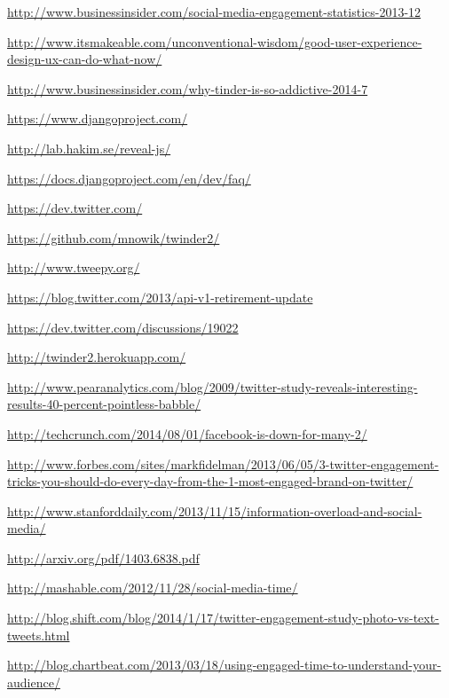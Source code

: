 \begin{thebibliography}{9}
\url{http://www.businessinsider.com/social-media-engagement-statistics-2013-12}


\url{http://www.itsmakeable.com/unconventional-wisdom/good-user-experience-design-ux-can-do-what-now/}

\url{http://www.businessinsider.com/why-tinder-is-so-addictive-2014-7}


\url{https://www.djangoproject.com/}

\url{http://lab.hakim.se/reveal-js/}

\url{https://docs.djangoproject.com/en/dev/faq/}

\url{https://dev.twitter.com/}

\url{https://github.com/mnowik/twinder2/}

\url{http://www.tweepy.org/}

\url{https://blog.twitter.com/2013/api-v1-retirement-update}

\url{https://dev.twitter.com/discussions/19022}

\url{http://twinder2.herokuapp.com/}



\url{http://www.pearanalytics.com/blog/2009/twitter-study-reveals-interesting-results-40-percent-pointless-babble/}

\url{http://techcrunch.com/2014/08/01/facebook-is-down-for-many-2/}

\url{http://www.forbes.com/sites/markfidelman/2013/06/05/3-twitter-engagement-tricks-you-should-do-every-day-from-the-1-most-engaged-brand-on-twitter/}

\url{http://www.stanforddaily.com/2013/11/15/information-overload-and-social-media/}

\url{http://arxiv.org/pdf/1403.6838.pdf}

\url{http://mashable.com/2012/11/28/social-media-time/}

\url{http://blog.shift.com/blog/2014/1/17/twitter-engagement-study-photo-vs-text-tweets.html}

\url{http://blog.chartbeat.com/2013/03/18/using-engaged-time-to-understand-your-audience/}
  
\end{thebibliography}


